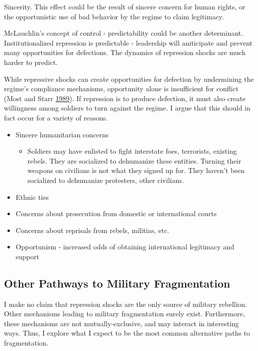 \documentclass[
  12pt,
]{article}
\providecommand{\tightlist}{%
  \setlength{\itemsep}{0pt}\setlength{\parskip}{0pt}}
\begin{document}
Sincerity. This effect could be the result of sincere concern for human rights, or the opportunistic use of bad behavior by the regime to claim legitimacy.

McLauchlin's concept of control - predictability could be another determinant. Institutionalized repression is predictable - leadership will aniticipate and prevent many opportunities for defections. The dynamics of repression shocks are much harder to predict.

While repressive shocks can create opportunities for defection by undermining the regime's compliance mechanisms, opportunity alone is insufficient for conflict (Most and Starr \protect\hyperlink{ref-Most1989}{1989}). If repression is to produce defection, it must also create willingness among soldiers to turn against the regime. I argue that this should in fact occur for a variety of reasons.

\begin{itemize}
\tightlist
\item
  Sincere humanitarian concerns

  \begin{itemize}
  \tightlist
  \item
    Soldiers may have enlisted to fight interstate foes, terrorists, existing rebels. They are socialized to dehumanize these entities. Turning their weapons on civilians is not what they signed up for. They haven't been socialized to dehumanize protesters, other civilians.
  \end{itemize}
\item
  Ethnic ties
\item
  Concerns about prosecution from domestic or international courts
\item
  Concerns about reprisals from rebels, militias, etc.
\item
  Opportunism - increased odds of obtaining international legitimacy and support
\end{itemize}

\hypertarget{other-pathways-to-military-fragmentation}{%
\subsection{Other Pathways to Military Fragmentation}\label{other-pathways-to-military-fragmentation}}

I make no claim that repression shocks are the only source of military rebellion. Other mechanisms leading to military fragmentation surely exist. Furthermore, these mechanisms are not mutually-exclusive, and may interact in interesting ways. Thus, I explore what I expect to be the most common alternative paths to fragmentation.
\end{document}
